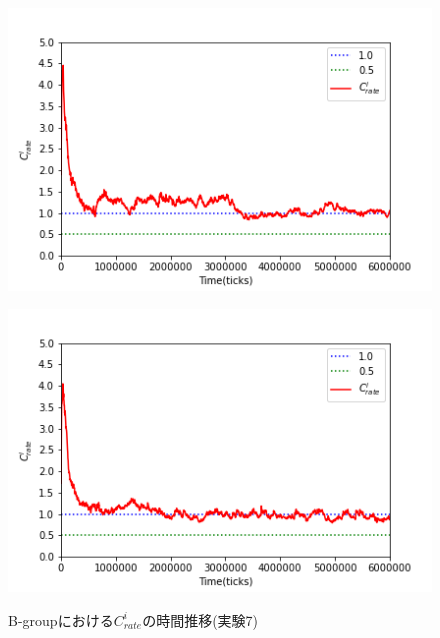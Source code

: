 \documentclass[12pt,a4j,twoside]{jarticle}
\begin{document}
  \begin{figure}
    \begin{minipage}{0.48\hsize}
      \centering
      \includegraphics[width=0.99\hsize]{figures/Rate_Office_Bgroup_2.png}
      \label{subfig:rate_Office_B_2}
    \end{minipage}
    \hfill
    \begin{minipage}{0.48\hsize}
      \centering
      \includegraphics[width=0.99\hsize]{figures/Rate_Office_Bgroup_6.png}
      \label{subfig:rate_Office_B_6}
    \end{minipage}
    \caption{B-groupにおける$C^i_{rate}$の時間推移(実験7)}
    \label{fig:rate_Office_B}
  \end{figure}
\end{document}
